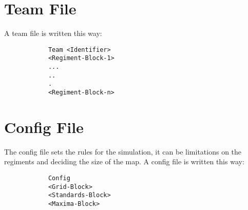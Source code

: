 \section{Team File}
\label{doc:teamfile}
	A team file is written this way: \\
		\begin{verbatim}
			Team <Identifier>
			<Regiment-Block-1>
			...
			..
			.
			<Regiment-Block-n>
		\end{verbatim}
	
\section{Config File}
\label{doc:cfgfile}
	The config file sets the rules for the simulation, it can be limitations on the regiments and deciding the size of the map.
	A config file is written this way: \\
		\begin{verbatim}
			Config
			<Grid-Block>
			<Standards-Block>
			<Maxima-Block>
		\end{verbatim}
	
